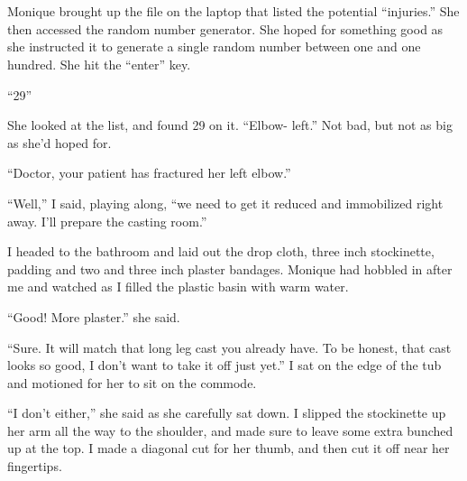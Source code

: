 \chapter{}
\begin{thought}
Monique brought up the file on the laptop that listed the potential ``injuries.'' She then
accessed the random number generator. She hoped for something good as she instructed it to
generate a single random number between one and one hundred. She hit the ``enter'' key.
\end{thought}

``29''

\begin{thought}
She looked at the list, and found 29 on it. ``Elbow- left.'' Not bad, but not as big as she'd
hoped for.
\end{thought}

``Doctor, your patient has fractured her left elbow.''

``Well,'' I said, playing along, ``we need to get it reduced and immobilized right away. I'll
prepare the casting room.''

I headed to the bathroom and laid out the drop cloth, three inch stockinette, padding and
two and three inch plaster bandages. Monique had hobbled in after me and watched as I filled the
plastic basin with warm water.

``Good! More plaster.'' she said.

``Sure. It will match that long leg cast you already have. To be honest, that cast looks so
good, I don't want to take it off just yet.'' I sat on the edge of the tub and motioned for her
to sit on the commode.

``I don't either,'' she said as she carefully sat down. I slipped the stockinette up her arm
all the way to the shoulder, and made sure to leave some extra bunched up at the top. I made a
diagonal cut for her thumb, and then cut it off near her fingertips.

